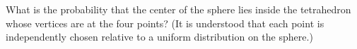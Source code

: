 What is the probability that the center of the sphere lies inside the
tetrahedron whose vertices are at the four points? (It is understood that
each point is independently chosen relative to a uniform distribution on
the sphere.)
